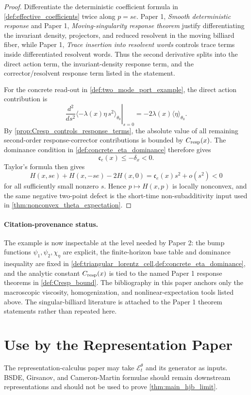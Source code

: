 \documentclass[11pt]{amsart}
\theoremstyle{definition}
\theoremstyle{remark}
\newcommand{\Etheta}{\mathcal E^\theta}
\newcommand{\PaperOne}[2]{Paper 1, \emph{#1}}
\begin{document}
\begin{proof}
Differentiate the deterministic coefficient formula in
\cref{def:effective_coefficients} twice along $p=se$.
\PaperOne{Smooth deterministic response}{thm:smooth_deterministic_response} and
\PaperOne{Moving-singularity response theorem}{thm:moving_singularity_response}
justify differentiating the invariant density, projectors, and reduced
resolvent in the moving billiard fiber, while
\PaperOne{Trace insertion into resolvent words}{lem:trace_resolvent_insertion}
controls trace terms inside differentiated resolvent words.  Thus the second
derivative splits into the direct action term, the invariant-density response
term, and the corrector/resolvent response term listed in the statement.

For the concrete read-out in \cref{def:two_mode_port_example}, the direct action
contribution is
\[
  \left.\frac{d^2}{ds^2}
  \langle-\lambda(x)\eta\,s^2\rangle_{\theta_0}\right|_{s=0}
  =
  -2\lambda(x)\langle\eta\rangle_{\theta_0}.
\]
By \cref{prop:Cresp_controls_response_terms}, the absolute value of all
remaining second-order response-corrector contributions is bounded by
$C_{\rm resp}(x)$.
The dominance condition in \cref{def:concrete_eta_dominance} therefore gives
\[
  \mathfrak c_e(x)\le -\delta_x<0 .
\]
Taylor's formula then gives
\[
  H(x,se)+H(x,-se)-2H(x,0)
  =\mathfrak c_e(x)s^2+o(s^2)<0
\]
for all sufficiently small nonzero $s$.  Hence $p\mapsto H(x,p)$ is locally
nonconvex, and the same negative two-point defect is the short-time
non-subadditivity input used in \cref{thm:nonconvex_theta_expectation}.
\end{proof}

\paragraph{Citation-provenance status.}
The example is now inspectable at the level needed by Paper 2: the bump
functions $\psi_1,\psi_2,\chi_\eta$ are explicit, the finite-horizon base table
and dominance inequality are fixed in
\cref{def:triangular_lorentz_cell,def:concrete_eta_dominance}, and the analytic
constant $C_{\rm resp}(x)$ is tied to the named Paper 1 response theorems in
\cref{def:Cresp_bound}.  The bibliography in this paper anchors only the
macroscopic viscosity, homogenization, and nonlinear-expectation tools listed
above.  The singular-billiard literature is attached to the Paper 1 theorem
statements rather than repeated here.

\section{Use by the Representation Paper}

The representation-calculus paper may take $\Etheta_t$ and its generator as
inputs.  BSDE, Girsanov, and Cameron-Martin formulae should remain downstream
representations and should not be used to prove \cref{thm:main_hjb_limit}.

\appendix




\end{document}
